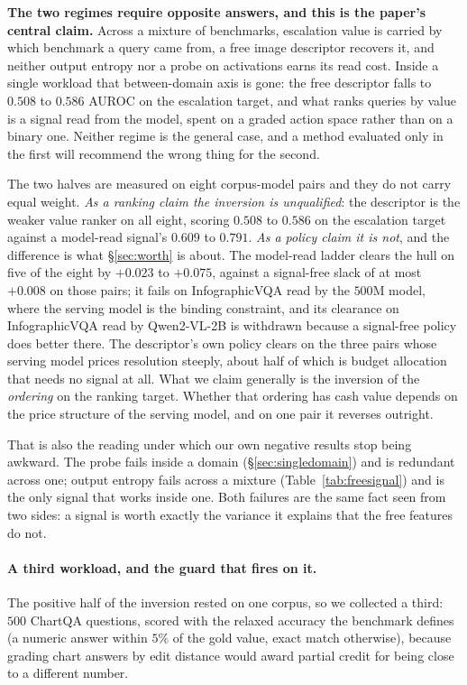 \documentclass[10pt,twocolumn]{article}
\theoremstyle{plain}
\begin{document}
\textbf{The two regimes require opposite answers, and this is the paper's
central claim.} Across a mixture of benchmarks, escalation value is carried by
which benchmark a query came from, a free image descriptor recovers it, and
neither output entropy nor a probe on activations earns its read cost. Inside a
single workload that between-domain axis is gone: the free descriptor falls to
$0.508$ to $0.586$ AUROC on the escalation target, and what ranks queries by
value is a signal read from the model, spent on a graded action space rather
than on a binary one. Neither regime is the general case, and a method
evaluated only in the first will recommend the wrong thing for the second.

The two halves are measured on eight corpus-model pairs and they do not carry
equal weight. \emph{As a ranking claim the inversion is unqualified}: the
descriptor is the weaker value ranker on all eight, scoring $0.508$ to $0.586$
on the escalation target against a model-read signal's $0.609$ to $0.791$.
\emph{As a policy claim it is not}, and the difference is what \S\ref{sec:worth}
is about. The model-read ladder clears the hull on five of the eight by
$+0.023$ to $+0.075$, against a signal-free slack of at most $+0.008$ on those
pairs; it fails on InfographicVQA read by the $500$M model, where the serving
model is the binding constraint, and its clearance on InfographicVQA read by
Qwen2-VL-2B is withdrawn because a signal-free policy does better there. The descriptor's own policy clears on the three pairs whose serving
model prices resolution steeply, about half of which is budget allocation that
needs no signal at all. What we claim generally is the inversion of the
\emph{ordering} on the ranking target. Whether that ordering has cash value
depends on the price structure of the serving model, and on one pair it
reverses outright.

That is also the reading under which our own negative results stop being
awkward. The probe fails inside a domain (\S\ref{sec:singledomain}) and is
redundant across one; output entropy fails across a mixture
(Table~\ref{tab:freesignal}) and is the only signal that works inside one. Both
failures are the same fact seen from two sides: a signal is worth exactly the
variance it explains that the free features do not.


\paragraph{A third workload, and the guard that fires on it.} The positive half
of the inversion rested on one corpus, so we collected a third: $500$ ChartQA
questions, scored with the relaxed accuracy the benchmark defines (a numeric
answer within $5\%$ of the gold value, exact match otherwise), because grading
chart answers by edit distance would award partial credit for being close to a
different number.
\end{document}
